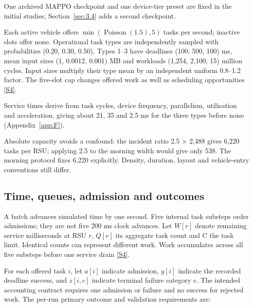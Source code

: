 \documentclass[12pt,a4paper]{article}
\begin{document}
One archived MAPPO checkpoint and one device-tier preset are fixed in the initial studies; Section~\ref{sec:3.4} adds a second checkpoint.

Each active vehicle offers $\min(\operatorname{Poisson}(1.5),5)$ tasks per second; inactive slots offer none. Operational task types are independently sampled with probabilities (0.20, 0.30, 0.50). Types 1--3 have deadlines (100, 500, 100) ms, mean input sizes (1, 0.0012, 0.001) MB and workloads (1,254, 2,100, 15) million cycles. Input sizes multiply their type mean by an independent uniform 0.8--1.2 factor. The five-slot cap changes offered work as well as scheduling opportunities \hyperref[source-s4]{[S4]}.

Service times derive from task cycles, device frequency, parallelism, utilisation and acceleration, giving about 21, 35 and 2.5 ms for the three types before noise (Appendix~\ref{app:F}).

Absolute capacity avoids a confound: the incident ratio 2.5 \ensuremath{\times} 2,488 gives 6,220 tasks per RSU; applying 2.5 to the morning width would give only 538. The morning protocol fixes 6,220 explicitly. Density, duration, layout and vehicle-entry conventions still differ.

\FloatBarrier
\subsection{Time, queues, admission and outcomes}\label{sec:2.4}

A batch advances simulated time by one second. Five internal task substeps order admissions; they are not five 200 ms clock advances. Let $W[r]$ denote remaining service milliseconds at RSU $r$, $Q[r]$ its aggregate task count and C the task limit. Identical counts can represent different work. Work accumulates across all five substeps before one service drain \hyperref[source-s4]{[S4]}.

For each offered task $i$, let $a[i]$ indicate admission, $y[i]$ indicate the recorded deadline success, and $z[i,c]$ indicate terminal failure category c. The intended accounting contract requires one admission or failure and no success for rejected work. The per-run primary outcome and validation requirements are:
\end{document}
